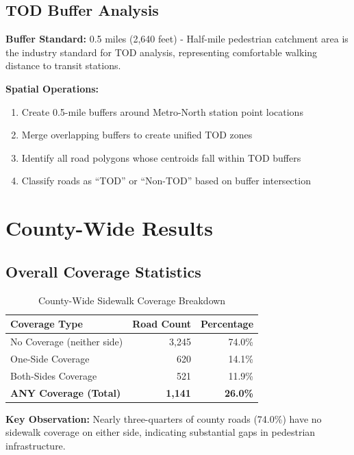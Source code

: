 \documentclass[11pt,letterpaper]{article}
\begin{document}
\subsection{TOD Buffer Analysis}

\textbf{Buffer Standard:} 0.5 miles (2,640 feet) - Half-mile pedestrian catchment area is the industry standard for TOD analysis, representing comfortable walking distance to transit stations.

\textbf{Spatial Operations:}
\begin{enumerate}
    \item Create 0.5-mile buffers around Metro-North station point locations
    \item Merge overlapping buffers to create unified TOD zones
    \item Identify all road polygons whose centroids fall within TOD buffers
    \item Classify roads as ``TOD'' or ``Non-TOD'' based on buffer intersection
\end{enumerate}

\section{County-Wide Results}

\subsection{Overall Coverage Statistics}

\begin{table}[H]
\centering
\begin{tabular}{@{}lrr@{}}
\toprule
\textbf{Coverage Type} & \textbf{Road Count} & \textbf{Percentage} \\
\midrule
No Coverage (neither side) & 3,245 & 74.0\% \\
One-Side Coverage & 620 & 14.1\% \\
Both-Sides Coverage & 521 & 11.9\% \\
\midrule
\textbf{ANY Coverage (Total)} & \textbf{1,141} & \textbf{26.0\%} \\
\bottomrule
\end{tabular}
\caption{County-Wide Sidewalk Coverage Breakdown}
\end{table}

\textbf{Key Observation:} Nearly three-quarters of county roads (74.0\%) have no sidewalk coverage on either side, indicating substantial gaps in pedestrian infrastructure.
\end{document}
